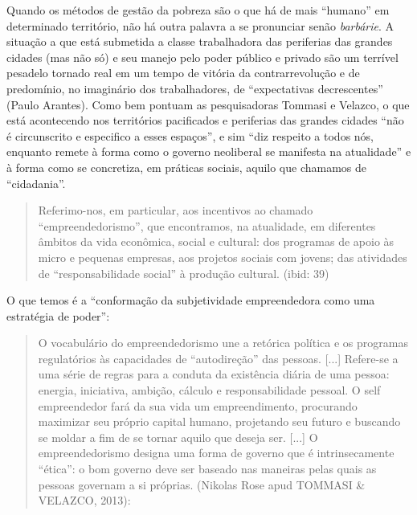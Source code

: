 Quando os métodos de gestão da pobreza são o que há de mais ``humano''
em determinado território, não há outra palavra a se pronunciar senão
\emph{barbárie}. A situação a que está submetida a classe trabalhadora
das periferias das grandes cidades (mas não só) e seu manejo pelo poder
público e privado são um terrível pesadelo tornado real em um tempo de
vitória da contrarrevolução e de predomínio, no imaginário dos
trabalhadores, de ``expectativas decrescentes'' (Paulo Arantes). Como
bem pontuam as pesquisadoras Tommasi e Velazco, o que está acontecendo
nos territórios pacificados e periferias das grandes cidades ``não é
circunscrito e especifico a esses espaços'', e sim ``diz respeito a
todos nós, enquanto remete à forma como o governo neoliberal se
manifesta na atualidade'' e à forma como se concretiza, em práticas
sociais, aquilo que chamamos de ``cidadania''.

\begin{quote}
Referimo-nos, em particular, aos incentivos ao chamado
``empreendedorismo'', que encontramos, na atualidade, em diferentes
âmbitos da vida econômica, social e cultural: dos programas de apoio às
micro e pequenas empresas, aos projetos sociais com jovens; das
atividades de ``responsabilidade social'' à produção cultural. (ibid:
39)
\end{quote}

O que temos é a ``conformação da subjetividade empreendedora como uma
estratégia de poder'':

\begin{quote}
O vocabulário do empreendedorismo une a retórica política e os programas
regulatórios às capacidades de ``autodireção'' das pessoas. {[}...{]}
Refere-se a uma série de regras para a conduta da existência diária de
uma pessoa: energia, iniciativa, ambição, cálculo e responsabilidade
pessoal. O self empreendedor fará da sua vida um empreendimento,
procurando maximizar seu próprio capital humano, projetando seu futuro e
buscando se moldar a fim de se tornar aquilo que deseja ser. {[}...{]} O
empreendedorismo designa uma forma de governo que é intrinsecamente
``ética'': o bom governo deve ser baseado nas maneiras pelas quais as
pessoas governam a si próprias. (Nikolas Rose apud TOMMASI \& VELAZCO,
2013):
\end{quote}

